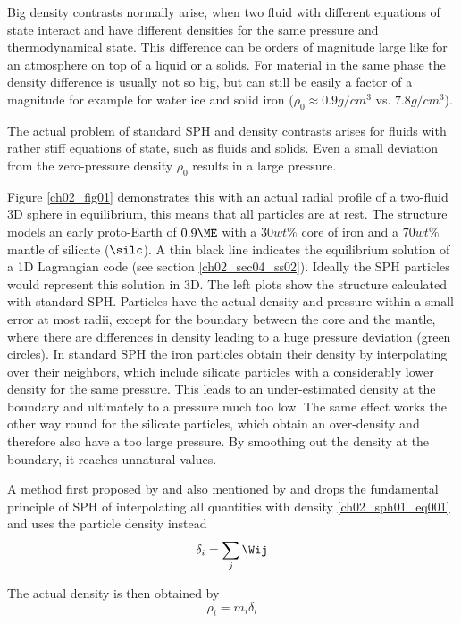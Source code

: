 Big density contrasts normally arise, when two fluid with different equations of state interact and have different densities for the same pressure and thermodynamical state. This difference can be orders of magnitude large like for an atmosphere on top of a liquid or a solids. For material in the same phase the density difference is usually not so big, but can still be easily a factor of a magnitude for example for water ice and solid iron ($\rho_0 \approx 0.9 g/cm^3$ vs. $7.8 g/cm^3$).

The actual problem of standard SPH and density contrasts arises for fluids with rather stiff equations of state, such as fluids and solids. Even a small deviation from the zero-pressure density $\rho_0$  results in a large pressure. 

Figure \ref{ch02_fig01} demonstrates this with an actual radial profile of a two-fluid 3D sphere in equilibrium, this means that all particles are at rest. The structure models an early proto-Earth of $0.9 \ME$ with a $30 wt\%$ core of iron and a $70 wt\%$ mantle of silicate ($\silc$). A thin black line indicates the equilibrium solution of a 1D Lagrangian code (see section \ref{ch02_sec04_ss02}). Ideally the SPH particles would represent this solution in 3D. The left plots show the structure calculated with standard SPH. Particles have the actual density and pressure within a small error at most radii, except for the boundary between the core and the mantle, where there are differences in density leading to a huge pressure deviation (green circles). In standard SPH the iron particles obtain their density by interpolating over their neighbors, which include silicate particles with a considerably lower density for the same pressure. This leads to an under-estimated density at the boundary and ultimately to a pressure much too low. The same effect works the other way round for the silicate particles, which obtain an over-density and therefore also have a too large pressure.  By smoothing out the density at the boundary, it reaches unnatural values. 

A method first proposed by \citep{Ott:2003p3727} and also mentioned by \cite{Solenthaler:2008p3720} and \cite{Price:2004p2613} drops the fundamental principle of SPH of interpolating all quantities with density \ref{ch02_sph01_eq001} and uses the particle density instead 
\begin{equation}
\label{ch02_sph01_eq030}
\delta_i = \sum_{j} \Wij
\end{equation}

The actual density is then obtained by 
\begin{equation}
\label{ch02_sph01_eq031}
\rho_i = m_i \delta_i
\end{equation}

